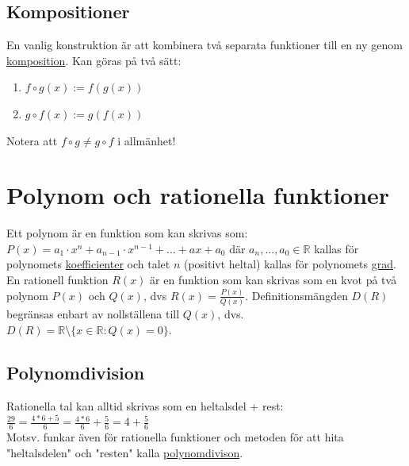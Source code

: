 \section{Kompositioner}
En vanlig konstruktion är att kombinera två separata funktioner till en ny genom \underline{komposition}.
Kan göras på två sätt:
\begin{enumerate}
    \item $f\circ g(x):=f(g(x))$
    \item $g\circ f(x):=g(f(x))$
\end{enumerate}
Notera att $f\circ g\neq g\circ f$ i allmänhet!

\chapter{Polynom och rationella funktioner}
Ett polynom är en funktion som kan skrivas som:
$P(x)=a_1\cdot x^n+a_{n-1}\cdot x^{n-1}+...+ax+a_0$ där $a_n,... ,a_0\in\mathbb{R}$ kallas för polynomets \underline{koefficienter} och talet $n$ (positivt heltal) kallas för polynomets \underline{grad}.
En rationell funktion $R(x)$ är en funktion som kan skrivas som en kvot på två polynom $P(x)$ och $Q(x)$, dvs $R(x)=\frac{P(x)}{Q(x)}$.
Definitionsmängden $D(R)$ begränsas enbart av nollställena till $Q(x)$, dvs. $D(R)=\mathbb{R}\setminus \{x\in\mathbb{R}:Q(x)=0\}$.

\section{Polynomdivision}
Rationella tal kan alltid skrivas som en heltalsdel + rest:\\
$\frac{29}{6}=\frac{4*6+5}{6}=\frac{4*6}{6}+\frac{5}{6}=4+\frac{5}{6}$\\
Motsv. funkar även för rationella funktioner  och metoden för att hita "heltalsdelen" och "resten" kalla \underline{polynomdivison}.

